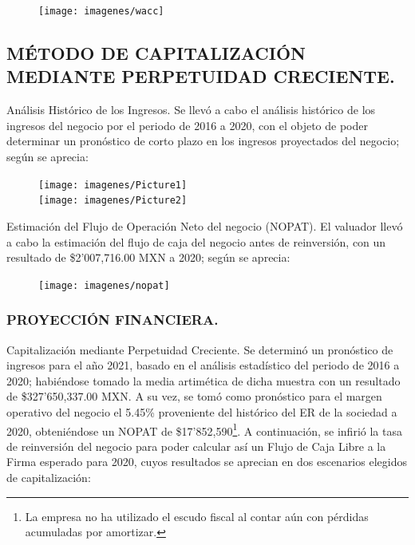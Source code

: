 \begin{figure}[H]
\centering
\texttt{[image: imagenes/wacc]}
\end{figure}

\subsection{M\'ETODO DE CAPITALIZACI\'ON MEDIANTE PERPETUIDAD CRECIENTE.}

\textcolor{principal}{An\'alisis Hist\'orico de los Ingresos.} Se llev\'o a cabo el an\'alisis hist\'orico de los ingresos del negocio por el periodo de 2016 a 2020, con el objeto de poder determinar un pron\'ostico de corto plazo en los ingresos proyectados del negocio; seg\'un se aprecia:

\begin{figure}[H]
\centering
\texttt{[image: imagenes/Picture1]}\\
\texttt{[image: imagenes/Picture2]}
\end{figure}

\textcolor{principal}{Estimaci\'on del Flujo de Operaci\'on Neto del negocio (NOPAT).} El valuador llev\'o a cabo la estimaci\'on del flujo de caja del negocio antes de reinversi\'on, con un resultado de \$2'007,716.00 MXN a 2020; seg\'un se aprecia:

\begin{figure}[H]
\centering
\texttt{[image: imagenes/nopat]}
\end{figure}

\subsubsection{PROYECCI\'ON FINANCIERA.}
\textcolor{principal}{Capitalizaci\'on mediante Perpetuidad Creciente.} Se determin\'o un pron\'ostico de ingresos para el a\~no 2021, basado en el an\'alisis estad\'istico del periodo de 2016 a 2020; habi\'endose tomado la media artim\'etica de dicha muestra con un resultado de \$327'650,337.00 MXN. A su vez, se tom\'o como pron\'ostico para el margen operativo del negocio el 5.45\% proveniente del hist\'orico del ER de la sociedad a 2020, obteni\'endose un NOPAT de \$17'852,590\footnote{La empresa no ha utilizado el escudo fiscal al contar a\'un con p\'erdidas acumuladas por amortizar.}.  A continuaci\'on, se infiri\'o la tasa de reinversi\'on del negocio para poder calcular as\'i un Flujo de Caja Libre a la Firma esperado para 2020, cuyos resultados se aprecian en dos escenarios elegidos de capitalizaci\'on:\\


